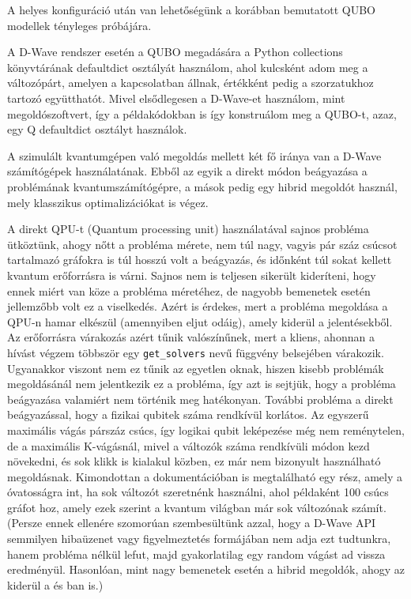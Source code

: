 A helyes konfiguráció után van lehetőségünk a korábban bemutatott QUBO modellek tényleges próbájára.

A D-Wave rendszer esetén a QUBO megadására a Python collections könyvtárának defaultdict osztályát használom, ahol kulcsként adom meg a változópárt, amelyen a kapcsolatban állnak, értékként pedig a szorzatukhoz tartozó együtthatót. Mivel elsődlegesen a D-Wave-et használom, mint megoldószoftvert, így a példakódokban is így konstruálom meg a QUBO-t, azaz, egy Q defaultdict osztályt használok.

A szimulált kvantumgépen való megoldás mellett két fő iránya van a D-Wave számítógépek használatának. Ebből az egyik a direkt módon beágyazása a problémának kvantumszámítógépre, a mások pedig egy hibrid megoldót használ, mely klasszikus optimalizációkat is végez.


A direkt QPU-t (Quantum processing unit) használatával sajnos probléma ütköztünk, ahogy nőtt a probléma mérete, nem túl nagy, vagyis pár száz csúcsot tartalmazó gráfokra is túl hosszú volt a beágyazás, és időnként túl sokat kellett kvantum erőforrásra is várni. Sajnos nem is teljesen sikerült kideríteni, hogy ennek miért van köze a probléma méretéhez, de nagyobb bemenetek esetén jellemzőbb volt ez a viselkedés. Azért is érdekes, mert a probléma megoldása a QPU-n hamar elkészül (amennyiben eljut odáig), amely kiderül a jelentésekből. Az erőforrásra várakozás azért tűnik valószínűnek, mert a kliens, ahonnan a hívást végzem többször egy \verb+get_solvers+ nevű függvény belsejében várakozik. Ugyanakkor viszont nem ez tűnik az egyetlen oknak, hiszen kisebb problémák megoldásánál nem jelentkezik ez a probléma, így azt is sejtjük, hogy a probléma beágyazása valamiért nem történik meg hatékonyan.
További probléma a direkt beágyazással, hogy a fizikai qubitek száma rendkívül korlátos. Az egyszerű maximális vágás párszáz csúcs, így logikai qubit leképezése még nem reménytelen, de a maximális K-vágásnál, mivel a változók száma rendkívüli módon kezd növekedni, és sok klikk is kialakul közben, ez már nem bizonyult használható megoldásnak. Kimondottan a dokumentációban is megtalálható egy rész, amely a óvatosságra int, ha sok változót szeretnénk használni, ahol példaként 100 csúcs gráfot hoz, amely ezek szerint a kvantum világban már sok változónak számít. (Persze ennek ellenére szomorúan szembesültünk azzal, hogy a D-Wave API semmilyen hibaüzenet vagy figyelmeztetés formájában nem adja ezt tudtunkra, hanem probléma nélkül lefut, majd gyakorlatilag egy random vágást ad vissza eredményül. Hasonlóan, mint nagy bemenetek esetén a hibrid megoldók, ahogy az kiderül a  és ban is.)


